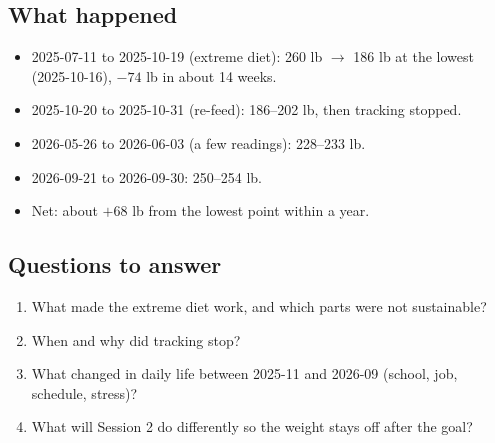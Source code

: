\subsection*{What happened}
\begin{itemize}[leftmargin=1.5em]
\item 2025-07-11 to 2025-10-19 (extreme diet): 260 lb $\to$ 186 lb at the lowest (2025-10-16), $-74$ lb in about 14 weeks.
\item 2025-10-20 to 2025-10-31 (re-feed): 186--202 lb, then tracking stopped.
\item 2026-05-26 to 2026-06-03 (a few readings): 228--233 lb.
\item 2026-09-21 to 2026-09-30: 250--254 lb.
\item Net: about $+68$ lb from the lowest point within a year.
\end{itemize}

\subsection*{Questions to answer}
\begin{enumerate}[leftmargin=1.5em]
\item What made the extreme diet work, and which parts were not sustainable?
\item When and why did tracking stop?
\item What changed in daily life between 2025-11 and 2026-09 (school, job, schedule, stress)?
\item What will Session 2 do differently so the weight stays off after the goal?
\end{enumerate}
